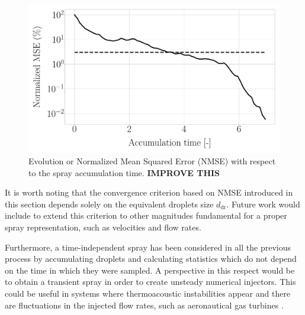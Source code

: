 \begin{figure}[h!]
	\centering
	\includegraphics[scale=0.35]{./part2_developments/figures_ch4_SLI/spray_convergence}
	\caption{Evolution or Normalized Mean Squared Error (NMSE) with respect to the spray accumulation time. \textbf{IMPROVE THIS}}
	\label{fig:NMSE_evolution}
\end{figure}

It is worth noting that the convergence criterion based on NMSE introduced in this section depends solely on the equivalent droplets size $d_\mathrm{dr}$. Future work would include to extend this criterion to other magnitudes fundamental for a proper spray representation, such as velocities and flow rates. 

Furthermore, a time-independent spray has been considered in all the previous process by accumulating droplets and calculating statistics which do not depend on the time in which they were sampled. A perspective in this respect would be to obtain a transient spray in order to create unsteady numerical injectors. This could be useful in systems where thermoacoustic instabilities appear and there are fluctuations in the injected flow rates, such as aeronautical gas turbines .


%
%
%



